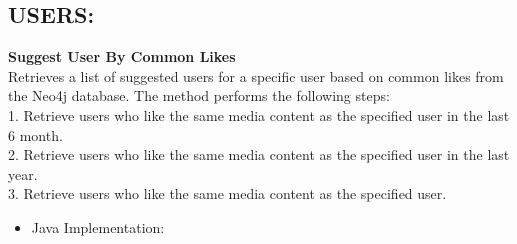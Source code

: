 \subsection*{USERS:}
\textbf{Suggest User By Common Likes}\\
Retrieves a list of suggested users for a specific user based on common likes from the Neo4j database.
The method performs the following steps:\\
1. Retrieve users who like the same media content as the specified user in the last 6 month.\\
2. Retrieve users who like the same media content as the specified user in the last year.\\
3. Retrieve users who like the same media content as the specified user.\\
\begin{itemize}
    \item Java Implementation:
\end{itemize}
